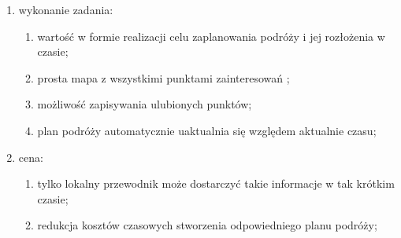 \begin{enumerate}[label=\Roman*.]
\begin{enumerate}[label=\alph*.]
\begin{enumerate}[label=\roman*.]
        \end{enumerate}
        \item wykonanie zadania:
        \begin{enumerate}[label=\roman*.]
            \item wartość w formie realizacji celu zaplanowania podróży i jej rozłożenia w czasie;
            \item prosta mapa z wszystkimi punktami zainteresowań ;
            \item możliwość zapisywania ulubionych punktów;
            \item plan podróży automatycznie uaktualnia się względem aktualnie  czasu;
        \end{enumerate}
        \item cena:
        \begin{enumerate}[label=\roman*.]
            \item tylko lokalny przewodnik może dostarczyć takie informacje w tak krótkim czasie;
            \item redukcja kosztów czasowych stworzenia odpowiedniego planu podróży;
        \end{enumerate}

    \end{enumerate}
\end{enumerate}
